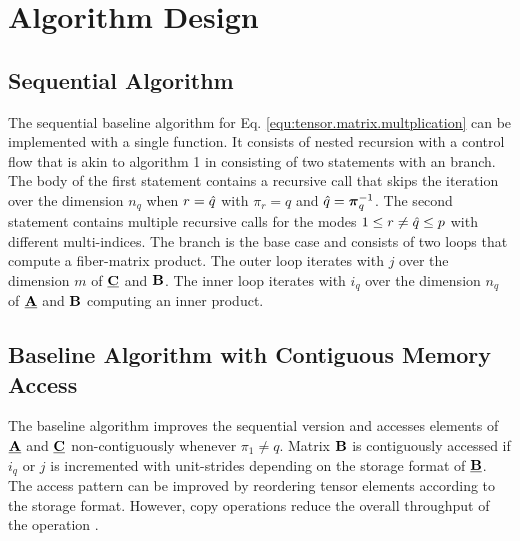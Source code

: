 \section{Algorithm Design}
\label{sec:design}
\subsection{Sequential Algorithm}
\label{sec:design:sequential.baseline.algorithm}
The sequential baseline algorithm for Eq. \ref{equ:tensor.matrix.multplication} can be implemented with a single  function.
It consists of nested recursion with a control flow that is akin to algorithm 1 in \cite{bassoy:2018:fast} consisting of two  statements with an  branch.
The body of the first  statement contains a recursive call that skips the iteration over the dimension $n_{q}$ when $r = \hat{q}$ with $\pi_r = q$ and $\hat{q} = \boldsymbol{\pi}^{-1}_q$.
The second  statement contains multiple recursive calls for the modes $1 \leq r \neq \hat{q} \leq p$ with different multi-indices.
The  branch is the base case and consists of two loops that compute a fiber-matrix product.
The outer loop iterates with $j$ over the dimension $m$ of $\underline{\mathbf{C}}$ and $\mathbf{B}$.
The inner loop iterates with $i_q$ over the dimension $n_q$ of $\underline{\mathbf{A}}$ and $\mathbf{B}$ computing an inner product. 


\subsection{Baseline Algorithm with Contiguous Memory Access}
\label{sec:design:modified.baseline.algorithm}
The baseline algorithm improves the sequential version and accesses elements of $\underline{\mathbf{A}}$ and $\underline{\mathbf{C}}$ non-contiguously whenever $\pi_1 \neq q$. %
Matrix $\mathbf{B}$ is contiguously accessed if $i_q$ or $j$ is incremented with unit-strides depending on the storage format of $\underline{\mathbf{B}}$.
The access pattern can be improved by reordering tensor elements according to the storage format.
However, copy operations reduce the overall throughput of the operation \cite{shi:2016:tensor.contraction}.

